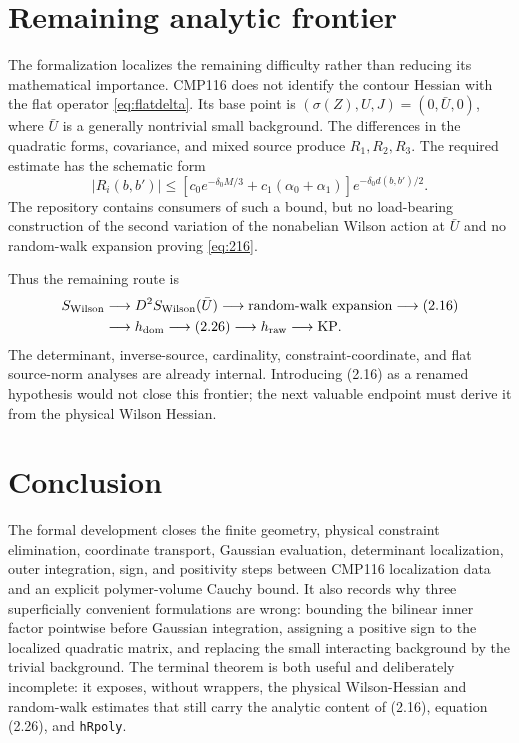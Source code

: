 \documentclass[11pt,a4paper]{article}
\theoremstyle{definition}
\newcommand{\lean}[1]{\texttt{#1}}
\begin{document}
\section{Remaining analytic frontier}

The formalization localizes the remaining difficulty rather than reducing its
mathematical importance.  CMP116 does not identify the contour Hessian with
the flat operator \eqref{eq:flatdelta}.  Its base point is
$(\sigma(Z),U,J)=(0,\bar U,0)$, where $\bar U$ is a generally nontrivial small
background.  The differences in the quadratic forms, covariance, and mixed
source produce $R_1,R_2,R_3$.  The required estimate has the schematic form
\begin{equation}\label{eq:216}
 |R_i(b,b')|
 \le
 \left[c_0e^{-\delta_0M/3}+c_1(\alpha_0+\alpha_1)\right]
 e^{-\delta_0 d(b,b')/2}.
\end{equation}
The repository contains consumers of such a bound, but no load-bearing
construction of the second variation of the nonabelian Wilson action at
$\bar U$ and no random-walk expansion proving \eqref{eq:216}.

Thus the remaining route is
\[
\begin{aligned}
 S_{\rm Wilson}
 &\longrightarrow D^2S_{\rm Wilson}(\bar U)
 \longrightarrow \text{random-walk expansion}
 \longrightarrow (2.16)\\
 &\longrightarrow h_{\rm dom}
 \longrightarrow (2.26)
 \longrightarrow h_{\mathrm{raw}}
 \longrightarrow \mathrm{KP}.
\end{aligned}
\]
The determinant, inverse-source, cardinality, constraint-coordinate, and flat
source-norm analyses are already internal.  Introducing (2.16) as a renamed
hypothesis would not close this frontier; the next valuable endpoint must
derive it from the physical Wilson Hessian.

\section{Conclusion}

The formal development closes the finite geometry, physical constraint
elimination, coordinate transport, Gaussian evaluation, determinant
localization, outer integration, sign, and positivity steps between CMP116
localization data and an explicit polymer-volume Cauchy bound.  It also
records why three superficially convenient formulations are wrong: bounding
the bilinear inner factor pointwise before Gaussian integration, assigning a
positive sign to the localized quadratic matrix, and replacing the small
interacting background by the trivial background.  The terminal theorem is
both useful and deliberately incomplete: it exposes, without wrappers, the
physical Wilson-Hessian and random-walk estimates that still carry the
analytic content of (2.16), equation (2.26), and \lean{hRpoly}.
\end{document}
